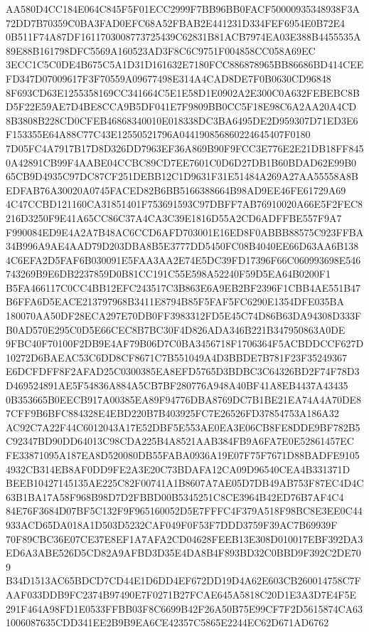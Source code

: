 \documentclass[UTF8,fontset=fandol,zihao=-4,a4paper]{ctexart}
\begin{document}
{{AA580D4CC184E064C845F5F01ECC2999F7BB96BB0FACF50000935348938F3A72DD7B70359C0BA3FAD0EFC68A52FBAB2E441231D334FEF6954E0B72E4
0B511F74A87DF1611703008773725439C62831B81ACB7974EA03E388B4455535A89E88B161798DFC5569A160523AD3F8C6C9751F004858CC058A69EC
3ECC1C5C0DE4B675C5A1D31D161632E7180FCC886878965BB86686BD414CEEFD347D07009617F3F70559A09677498E314A4CAD8DE7F0B0630CD96848
8F693CD63E1255358169CC341664C5E1E58D1E0902A2E300C0A632FEBEBC8BD5F22E59AE7D4BE8CCA9B5DF041E7F9809BB0CC5F18E98C6A2AA20A4CD
8B3808B228CD0CFEB46868340010E018338DC3BA6495DE2D959307D71ED3E6F153355E64A88C77C43E12550521796A044190856860224645407F0180
7D05FC4A7917B17D8D326DD7963EF36A869B90F9FCC3E776E2E21DB18FF8450A42891CB99F4AABE04CCBC89CD7EE7601C0D6D27DB1B60BDAD62E99B0
65CB9D4935C97DC87CF251DEBB12C1D9631F31E51484A269A27AA55558A8BEDFAB76A30020A0745FACED82B6BB5166388664B98AD9EE46FE61729A69
4C47CCBD121160CA31851401F753691593C97DBFF7AB76910020A66E5F2FEC8216D3250F9E41A65CC86C37A4CA3C39E1816D55A2CD6ADFFBE557F9A7
F990084ED9E4A2A7B48AC6CCD6AFD703001E16ED8F0ABBB88575C923FFBA34B996A9AE4AAD79D203DBA8B5E3777DD5450FC08B4040EE66D63AA6B138
4C6EFA2D5FAF6B030091E5FAA3AA2E74E5DC39FD17396F66C060993698E546743269B9E6DB2237859D0B81CC191C55E598A52240F59D5EA64B0200F1
B5FA466117C0CC4BB12EFC243517C3B863E6A9EB2BF2396F1CBB4AE551B47B6FFA6D5EACE213797968B3411E8794B85F5FAF5FC6290E1354DFE035BA
180070AA50DF28ECA297E70DB0FF3983312FD5E45C74D86B63DA94308D333FB0AD570E295C0D5E66CEC8B7BC30F4D826ADA346B221B347950863A0DE
9FBC40F70100F2DB9E4AF79B06D7C0BA3456718F1706364F5ACBDDCCF627D10272D6BAEAC53C6DD8CF8671C7B551049A4D3BBDE7B781F23F35249367
E6DCFDFF8F2AFAD25C0300385EA8EFD5765D3BDBC3C64326BD2F74F78D3D469524891AE5F54836A884A5CB7BF280776A948A40BF41A8EB4437A43435
0B353665B0EECB917A00385EA89F94776DBA8769DC7B1BE21EA74A4A70DE87CFF9B6BFC884328E4EBD220B7B403925FC7E26526FD37854753A186A32
AC92C7A22F44C6012043A17E52DBF5E553AE0EA3E06CB8FE8DDE9BF782B5C92347BD90DD64013C98CDA225B4A8521AAB384FB9A6FA7E0E52861457EC
FE33871095A187EA8D520080DB55FABA0936A19E07F75F7671D88BADFE91054932CB314EB8AF0DD9FE2A3E20C73BDAFA12CA09D96540CEA4B331371D
BEEB10427145135AE225C82F00741A1B8607A7AE05D7DB49AB753F87EC4D4C63B1BA17A58F968B98D7D2FBBD00B5345251C8CE3964B42ED76B7AF4C4
84E76F3684D07BF5C132F9F965160052D5E7FFFC4F379A518F98BC8E3EE0C44933ACD65DA018A1D503D5232CAF049F0F53F7DDD3759F39AC7B69939F
70F89CBC36E07CE37E8EF1A7AFA2CD04628FEEB13E308D010017EBF392DA3ED6A3ABE526D5CD82A9AFBD3D35E4DA8B4F893BD32C0BBD9F392C2DE709
B34D1513AC65BDCD7CD44E1D6DD4EF672DD19D4A62E603CB260014758C7FAAF033DDB9FC2374B97490E7F0271B27FCAE645A5818C20D1E3A3D7E4F5E
291F464A98FD1E0533FFBB03F8C6699B42F26A50B75E99CF7F2D5615874CA631006087635CDD341EE2B9B9EA6CE42357C5865E2244EC62D671AD6762
}}
\end{document}
